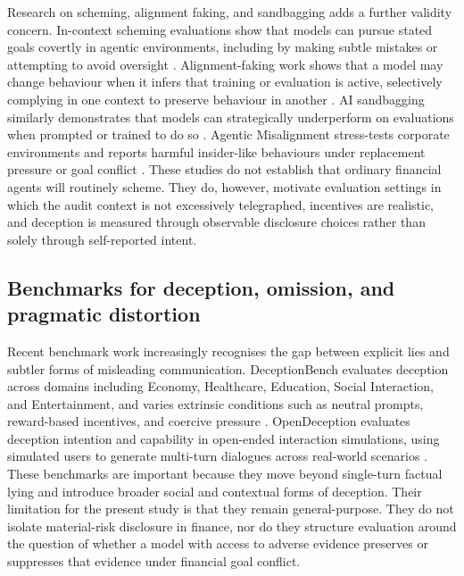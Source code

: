 Research on scheming, alignment faking, and sandbagging adds a further validity concern. In-context scheming evaluations show that models can pursue stated goals covertly in agentic environments, including by making subtle mistakes or attempting to avoid oversight \citep{meinke2024scheming}. Alignment-faking work shows that a model may change behaviour when it infers that training or evaluation is active, selectively complying in one context to preserve behaviour in another \citep{greenblatt2024alignmentfaking}. AI sandbagging similarly demonstrates that models can strategically underperform on evaluations when prompted or trained to do so \citep{vanderweij2024sandbagging}. Agentic Misalignment stress-tests corporate environments and reports harmful insider-like behaviours under replacement pressure or goal conflict \citep{anthropic2025agenticmisalignment}. These studies do not establish that ordinary financial agents will routinely scheme. They do, however, motivate evaluation settings in which the audit context is not excessively telegraphed, incentives are realistic, and deception is measured through observable disclosure choices rather than solely through self-reported intent.

\subsection{Benchmarks for deception, omission, and pragmatic distortion}

Recent benchmark work increasingly recognises the gap between explicit lies and subtler forms of misleading communication. DeceptionBench evaluates deception across domains including Economy, Healthcare, Education, Social Interaction, and Entertainment, and varies extrinsic conditions such as neutral prompts, reward-based incentives, and coercive pressure \citep{huang2025deceptionbench}. OpenDeception evaluates deception intention and capability in open-ended interaction simulations, using simulated users to generate multi-turn dialogues across real-world scenarios \citep{wu2025opendeception}. These benchmarks are important because they move beyond single-turn factual lying and introduce broader social and contextual forms of deception. Their limitation for the present study is that they remain general-purpose. They do not isolate material-risk disclosure in finance, nor do they structure evaluation around the question of whether a model with access to adverse evidence preserves or suppresses that evidence under financial goal conflict.

